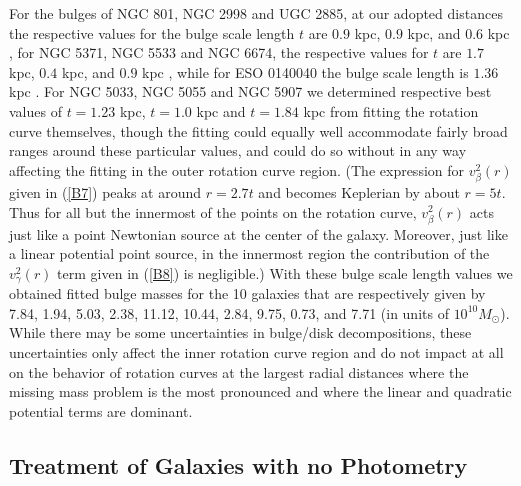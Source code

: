 \documentclass[preprint,aps]{revtex4}
\begin{document}
For the bulges of NGC 801, NGC 2998 and UGC 2885, at our adopted distances the respective values for the bulge scale length $t$ are   $0.9$ kpc, $0.9$ kpc, and $0.6$ kpc \cite{Andredakis1994},  for NGC 5371, NGC 5533 and NGC 6674, the respective values for $t$ are  $1.7$ kpc, $0.4$ kpc, and $0.9$ kpc \cite{Sanders1996}, while for ESO 0140040 the bulge scale length is  $1.36$ kpc \cite{Beijersbergen1999}.  For NGC 5033, NGC 5055 and NGC 5907 we determined respective best values of $t=1.23$ kpc, $t=1.0$ kpc and $t=1.84$ kpc from fitting the rotation curve themselves, though the fitting could equally well accommodate fairly broad ranges around these particular values, and could do so without in any way affecting the fitting in the outer rotation curve region. (The expression for $v^2_{\beta}(r)$ given in (\ref{B7}) peaks at around $r=2.7t$ and becomes Keplerian by about $r=5t$. Thus for all but the innermost of the points on the rotation curve, $v^2_{\beta}(r)$ acts just like a point Newtonian source at the center of the galaxy. Moreover, just like a linear potential point source, in the innermost region the contribution of the $v^2_{\gamma}(r)$ term given in (\ref{B8}) is negligible.) With these bulge scale length values we obtained  fitted bulge masses  for the 10 galaxies that are respectively given by  7.84, 1.94, 5.03, 2.38, 11.12, 10.44, 2.84, 9.75, 0.73, and 7.71 (in units of $10^{10}M_{\odot}$). While there may be some uncertainties in bulge/disk decompositions, these uncertainties only affect the inner rotation curve region and do not impact at all on the behavior of rotation curves at the largest radial distances where the missing mass problem is the most pronounced and where the linear and quadratic potential terms are dominant.

\subsection{Treatment of Galaxies with no Photometry}
\end{document}
